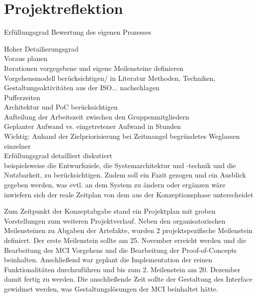 
\chapter{Projektreflektion}

Erfüllungsgrad
Bewertung des eigenen Prozesses

Hoher Detailierungsgrad\\
Voraus planen\\
Iterationen vorgegebene und eigene Meilensteine definieren\\
Vorgehensmodell berücksichtigen/ in Literatur Methoden, Techniken, Gestaltungsaktivitäten aus der ISO... nachschlagen\\
Pufferzeiten\\
Architektur und PoC berücksichtigen\\
Aufteilung der Arbeitszeit zwischen den Gruppenmitgliedern\\
Geplanter Aufwand vs. eingetretener Aufwand in Stunden\\
Wichtig: Anhand der Zielpriorisierung bei Zeitmangel begründetes Weglassen einzelner\\


Erfüllungsgrad detailliert diskutiert\\ 
beispielsweise die Entwurfsziele, die Systemarchitektur und -technik und die Nutzbarkeit, zu berücksichtigen. Zudem soll ein Fazit gezogen und ein Ausblick gegeben werden, was evtl. an dem System zu ändern oder ergänzen wäre\\
inwiefern sich der reale Zeitplan von dem aus der Konzeptionsphase unterscheidet

Zum Zeitpunkt der Konzeptabgabe stand ein Projektplan mit groben Vorstellungen zum weiteren Projektverlauf. Neben den organisatorischen Meilensteinen zu Abgaben der Artefakte, wurden 2 projektspezifische Meilenstein definiert. Der erste Meilenstein sollte am 25. November erreicht werden und die Bearbeitung des MCI Vorgehens und die Bearbeitung der Proof-of-Concepts beinhalten. 
Anschließend war geplant die Implementation der reinen Funktionalitäten durchzuführen und bis zum 2. Meilenstein am 20. Dezember damit fertig zu werden. Die anschließende Zeit sollte der Gestaltung des Interface gewidmet werden, was Gestaltungslösungen der MCI beinhaltet hätte. \\

